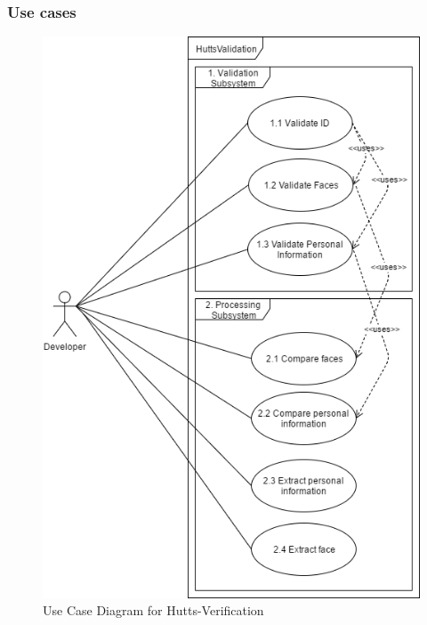 \documentclass{article}
\begin{document}
		\subsubsection{Use cases}
		\begin{figure}[h]
			\includegraphics[scale=0.6]{img/UseCase.png}
			\caption{Use Case Diagram for Hutts-Verification}
		\end{figure}
\end{document}

